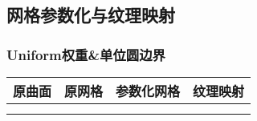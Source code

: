 \documentclass[14pt]{scrartcl} %
\begin{document}
	
	\pagebreak
	\subsection{网格参数化与纹理映射}
	\subsubsection{Uniform权重\&单位圆边界}
	\begin{table}[h] %
		\centering %
		\begin{tabular}{l l l l}
			\toprule
			\centering
			\textbf{原曲面} & \textbf{原网格} & \textbf{参数化网格} &\textbf{纹理映射}\\
			\midrule
			\begin{minipage}[t]{0.2\linewidth}
				\centering
			\end{minipage}&
			\begin{minipage}[t]{0.2\linewidth}
				\centering
			\end{minipage}&
			\begin{minipage}[t]{0.2\linewidth}
				\centering
			\end{minipage}&
			\begin{minipage}[t]{0.2\linewidth}
				\centering
			\end{minipage}\\
			\begin{minipage}[t]{0.2\linewidth}
				\centering
			\end{minipage}&
			\begin{minipage}[t]{0.2\linewidth}
				\centering
			\end{minipage}&
			\begin{minipage}[t]{0.2\linewidth}
				\centering
			\end{minipage}&
			\begin{minipage}[t]{0.2\linewidth}
				\centering
			\end{minipage}\\
			

\end{tabular}
\end{table}
\end{document}
